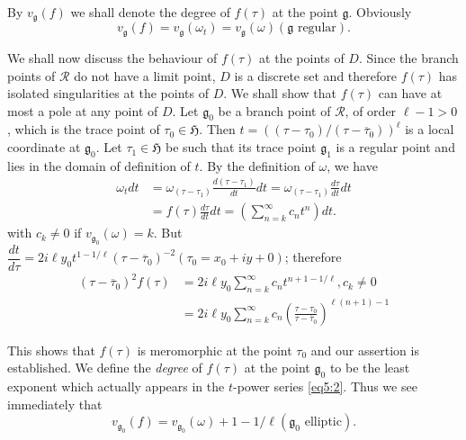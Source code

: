 By $v_{\mathfrak{g}}(f)$ we shall denote the degree of $f(\tau)$ at
the point $\mathfrak{g}$. Obviously 
$$
v_{\mathfrak{g}}(f) = v_{\mathfrak{g}}(\omega_t) =
v_{\mathfrak{g}}(\omega) (\mathfrak{g} \text{ regular}).
$$

We shall now discuss the behaviour of $f(\tau)$ at the points of
$D$. Since the branch points of $\mathscr{R}$ do not have a limit
point, $D$ is a discrete set and therefore $f(\tau)$ has isolated
singularities at the points of $D$. We shall show that $f(\tau)$ can
have at most a pole at any point of $D$. Let $\mathfrak{g}_0$ be a
branch point of $\mathscr{R}$, of order $\ell-1>0$, which is the trace
point of $\tau_0 \in \mathfrak{H}$. Then
$t=((\tau-\tau_0)/(\tau-\overline{\tau}_0))^{\ell}$ is a local
coordinate at $\mathfrak{g}_0$. Let $\tau_1\in \mathfrak{H}$
\pageoriginale be such that its trace point $\mathfrak{g}_1$ is a
regular point and lies in the domain of definition of $t$. By the
definition of $\omega$, we have
\begin{align*}
\omega_t dt & = \omega_{(\tau-\tau_1)} \frac{d(\tau-\tau_1)}{dt} dt =
\omega_{(\tau-\tau_1)} \frac{d\tau}{dt} dt\\
& = f(\tau) \frac{d\tau}{dt} dt = \left(\sum^{\infty}_{n=k} c_n
t^n\right) dt. 
\end{align*}
with $c_k \neq 0$ if $v_{\mathfrak{g}_0} (\omega) =k$. But
$\dfrac{dt}{d\tau}=2i\ell y_0
t^{1-1/\ell}(\tau-\overline{\tau}_0)^{-2}(\tau_0=x_0+iy+0)$; therefore
\begin{align*}
(\tau-\overline{\tau}_0)^2 f(\tau) & = 2i\ell y_0 \sum^{\infty}_{n=k}
  c_n t^{n+1-1/\ell}, c_k \neq 0\tag{2}\label{eq5:2}\\
& = 2i \ell y_0 \sum^{\infty}_{n=k} c_n
  \left(\frac{\tau-\tau_0}{\tau-\overline{\tau}_0}\right)^{\ell(n+1)-1} 
\end{align*}

This shows that $f(\tau)$ is meromorphic at the point $\tau_0$ and our
assertion is established. We define the \textit{degree} of $f(\tau)$
at the point $\mathfrak{g}_0$ to be the least exponent which actually
appears in the $t$-power series \eqref{eq5:2}. Thus we see immediately that 
$$
v_{\mathfrak{g}_0}(f) = v_{\mathfrak{g}_0}(\omega) +1 -1/\ell
(\mathfrak{g}_0 \text{ elliptic}).
$$

